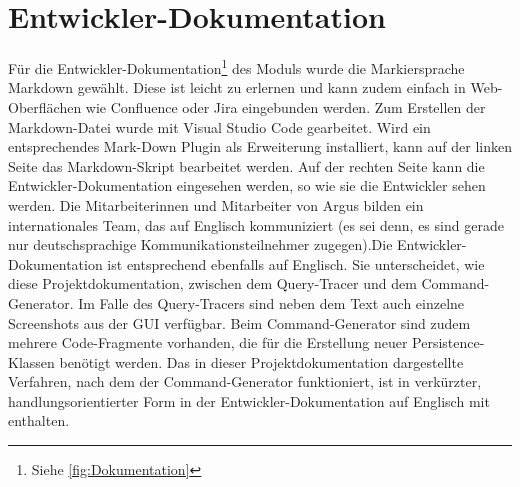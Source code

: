 \documentclass[11pt,toc=sectionentrywithoutdots, 
headheight=44pt, headings=optiontoheadandtoc, hyperfootnotes=false, hypertexnames=false]{scrartcl}
\newcommand\extendedref[1]{Siehe \ref{#1}}
\begin{document}

\section{Entwickler-Dokumentation}
Für die Entwickler-Dokumentation\footnote{\extendedref{fig:Dokumentation}} des Moduls wurde die Markiersprache Markdown gewählt. Diese ist leicht zu erlernen und kann zudem einfach in Web-Oberflächen wie Confluence oder Jira eingebunden werden. Zum Erstellen der Markdown-Datei wurde mit Visual Studio Code gearbeitet. Wird ein entsprechendes Mark-Down Plugin als Erweiterung installiert, kann auf der linken Seite das Markdown-Skript bearbeitet werden. Auf der rechten Seite kann die Entwickler-Dokumentation eingesehen werden, so wie sie die Entwickler sehen werden. Die Mitarbeiterinnen und Mitarbeiter von Argus bilden ein internationales Team, das auf Englisch kommuniziert (es sei denn, es sind gerade nur deutschsprachige Kommunikationsteilnehmer zugegen).\newline Die Entwickler-Dokumentation ist entsprechend ebenfalls auf Englisch. Sie unterscheidet, wie diese Projektdokumentation, zwischen dem Query-Tracer und dem Command-Generator. Im Falle des Query-Tracers sind neben dem Text auch einzelne Screenshots aus der GUI verfügbar. Beim Command-Generator sind zudem mehrere Code-Fragmente vorhanden, die für die Erstellung neuer Persistence-Klassen benötigt werden. Das in dieser Projektdokumentation dargestellte Verfahren, nach dem der Command-Generator funktioniert, ist in verkürzter, handlungsorientierter Form in der Entwickler-Dokumentation auf Englisch mit enthalten.
\end{document}
